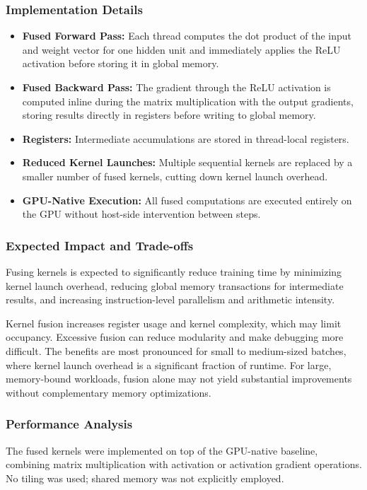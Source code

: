 \documentclass[conference, 12pt]{IEEEtran}
\begin{document}
\subsubsection{Implementation Details}
\begin{itemize} 
    \item \textbf{Fused Forward Pass:} Each thread computes the dot product of the input and weight vector for one hidden unit and immediately applies the ReLU activation before storing it in global memory.
    \item \textbf{Fused Backward Pass:} The gradient through the ReLU activation is computed inline during the matrix multiplication with the output gradients, storing results directly in registers before writing to global memory.
    \item \textbf{Registers:} Intermediate accumulations are stored in thread-local registers.
    \item \textbf{Reduced Kernel Launches:} Multiple sequential kernels are replaced by a smaller number of fused kernels, cutting down kernel launch overhead.
    \item \textbf{GPU-Native Execution:} All fused computations are executed entirely on the GPU without host-side intervention between steps.
\end{itemize}

\subsubsection{Expected Impact and Trade-offs}
Fusing kernels is expected to significantly reduce training time by minimizing kernel launch overhead, reducing global memory transactions for intermediate results, and increasing instruction-level parallelism and arithmetic intensity.

Kernel fusion increases register usage and kernel complexity, which may limit occupancy. Excessive fusion can reduce modularity and make debugging more difficult. The benefits are most pronounced for small to medium-sized batches, where kernel launch overhead is a significant fraction of runtime. For large, memory-bound workloads, fusion alone may not yield substantial improvements without complementary memory optimizations.

\subsubsection{Performance Analysis}
The fused kernels were implemented on top of the GPU-native baseline, combining matrix multiplication with activation or activation gradient operations. No tiling was used; shared memory was not explicitly employed.
\end{document}
